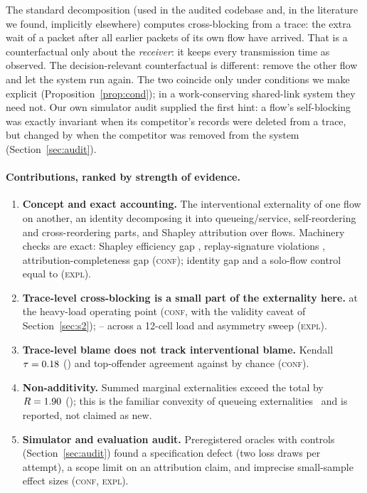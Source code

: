 \documentclass[11pt]{article}
\newcommand{\tagC}{\textsc{conf}}
\newcommand{\tagE}{\textsc{expl}}
\begin{document}
The standard decomposition (used in the audited codebase and, in the literature we found, implicitly elsewhere) computes cross-blocking from a trace: the extra wait of a packet after all earlier packets of its own flow have arrived.
That is a counterfactual only about the \emph{receiver}: it keeps every transmission time as observed.
The decision-relevant counterfactual is different: remove the other flow and let the system run again.
The two coincide only under conditions we make explicit (Proposition~\ref{prop:cond}); in a work-conserving shared-link system they need not.
Our own simulator audit supplied the first hint: a flow's self-blocking was exactly invariant when its competitor's records were deleted from a trace, but changed by \HFourRatioFIFO{} when the competitor was removed from the system (Section~\ref{sec:audit}).

\paragraph{Contributions, ranked by strength of evidence.}
\begin{enumerate}
  \item \textbf{Concept and exact accounting.} The interventional externality of one flow on another, an identity decomposing it into queueing/service, self-reordering and cross-reordering parts, and Shapley attribution over flows. Machinery checks are exact: Shapley efficiency gap \SBVone{}, replay-signature violations \SBVtwo{}, attribution-completeness gap \SBVfour{} (\tagC{}); identity gap \SBBIdentity{} and a solo-flow control equal to \SBBSolo{} (\tagE{}).
  \item \textbf{Trace-level cross-blocking is a small part of the externality here.} \SBrFour{} at the heavy-load operating point (\tagC{}, with the validity caveat of Section~\ref{sec:s2}); \SBBCrossMin{}--\SBBCrossMax{} across a 12-cell load and asymmetry sweep (\tagE{}).
  \item \textbf{Trace-level blame does not track interventional blame.} Kendall $\tau=0.18$ (\SBtauFourCI) and top-offender agreement \SBtopFour{} against \SBchanceFour{} by chance (\tagC{}).
  \item \textbf{Non-additivity.} Summed marginal externalities exceed the total by $R=1.90$ (\SBRFourCI); this is the familiar convexity of queueing externalities~\cite{naor1969tolls} and is reported, not claimed as new.
  \item \textbf{Simulator and evaluation audit.} Preregistered oracles with controls (Section~\ref{sec:audit}) found a specification defect (two loss draws per attempt), a scope limit on an attribution claim, and imprecise small-sample effect sizes (\tagC{}, \tagE{}).
\end{enumerate}
\end{document}
